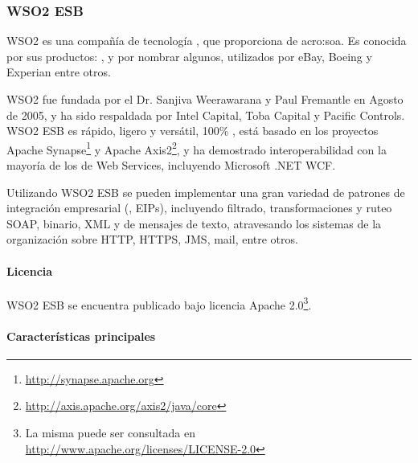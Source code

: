 \subsubsection{WSO2 ESB}
\label{soa:tecnologias:wso2-esb}

WSO2 es una compañía de tecnología , que proporciona  de \gls{acro:soa}.  Es conocida por sus productos: ,  y  por nombrar algunos, utilizados por eBay, Boeing y Experian entre otros.

WSO2 fue fundada por el Dr. Sanjiva Weerawarana y Paul Fremantle en Agosto de 2005, y ha sido respaldada por Intel Capital, Toba Capital y Pacific Controls.  WSO2 ESB es rápido, ligero y versátil, 100\% , está basado en los proyectos Apache Synapse\footnote{\url{http://synapse.apache.org}} y Apache Axis2\footnote{\url{http://axis.apache.org/axis2/java/core}}, y ha demostrado interoperabilidad con la mayoría de los  de Web Services, incluyendo Microsoft .NET WCF.

Utilizando WSO2 ESB se pueden implementar una gran variedad de patrones de integración empresarial (, EIPs), incluyendo filtrado, transformaciones y ruteo SOAP, binario, XML y de mensajes de texto, atravesando los sistemas de la organización sobre HTTP, HTTPS, JMS, mail, entre otros.

\paragraph{Licencia}

WSO2 ESB se encuentra publicado bajo licencia Apache 2.0\footnote{La misma puede ser consultada en \url{http://www.apache.org/licenses/LICENSE-2.0}}.

\paragraph{Características principales}

